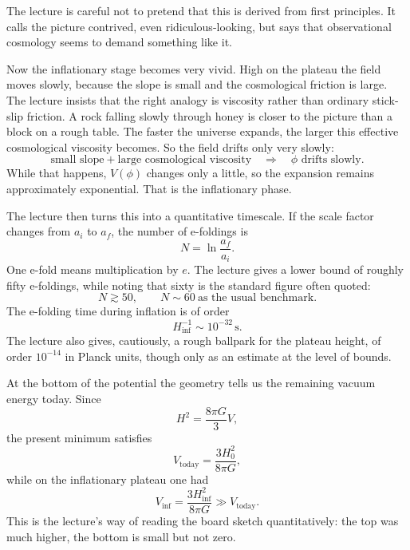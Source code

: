 The lecture is careful not to pretend that this is derived from first principles. It calls the picture contrived, even ridiculous-looking, but says that observational cosmology seems to demand something like it.

Now the inflationary stage becomes very vivid. High on the plateau the field moves slowly, because the slope is small and the cosmological friction is large. The lecture insists that the right analogy is viscosity rather than ordinary stick-slip friction. A rock falling slowly through honey is closer to the picture than a block on a rough table. The faster the universe expands, the larger this effective cosmological viscosity becomes. So the field drifts only very slowly:
\begin{equation}
\text{small slope} + \text{large cosmological viscosity}
\quad \Longrightarrow \quad
\phi \text{ drifts slowly}.
\end{equation}
While that happens, \(V(\phi)\) changes only a little, so the expansion remains approximately exponential. That is the inflationary phase.

The lecture then turns this into a quantitative timescale. If the scale factor changes from \(a_i\) to \(a_f\), the number of e-foldings is
\begin{equation}
N=\ln\frac{a_f}{a_i}.
\end{equation}
One e-fold means multiplication by \(e\). The lecture gives a lower bound of roughly fifty e-foldings, while noting that sixty is the standard figure often quoted:
\begin{equation}
N\gtrsim 50,
\qquad
N\sim 60 \ \text{as the usual benchmark.}
\end{equation}
The e-folding time during inflation is of order
\begin{equation}
H_{\mathrm{inf}}^{-1}\sim 10^{-32}\,\mathrm{s}.
\end{equation}
The lecture also gives, cautiously, a rough ballpark for the plateau height, of order \(10^{-14}\) in Planck units, though only as an estimate at the level of bounds.

At the bottom of the potential the geometry tells us the remaining vacuum energy today. Since
\begin{equation}
H^2=\frac{8\pi G}{3}V,
\end{equation}
the present minimum satisfies
\begin{equation}
V_{\mathrm{today}}=\frac{3H_0^2}{8\pi G},
\end{equation}
while on the inflationary plateau one had
\begin{equation}
V_{\mathrm{inf}}=\frac{3H_{\mathrm{inf}}^2}{8\pi G}\gg V_{\mathrm{today}}.
\end{equation}
This is the lecture's way of reading the board sketch quantitatively: the top was much higher, the bottom is small but not zero.

